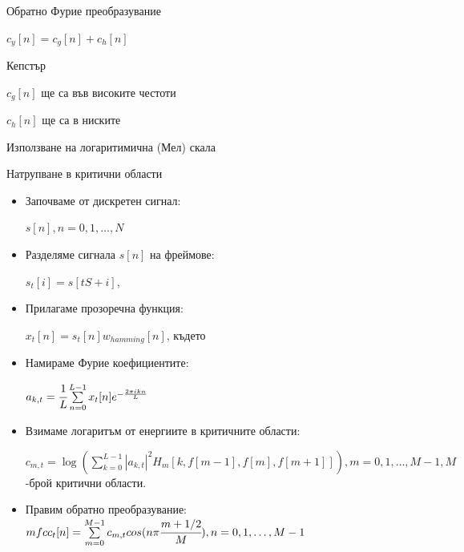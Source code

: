 \documentclass[9pt]{beamer}
\newcommand{\B}[1]{\left(#1\right)}
\begin{document}
\begin{frame}[t]
\begin{itemize}
{\begin{columns}
\begin{column}{0.48\textwidth}
                    \end{column}
                \end{columns}
        }
         {
            \item<5-11> Обратно Фурие преобразувание
            \item<6-11> $c_y[n] = c_g[n] + c_h[n]$
            \item<7-11> Кепстър
            \item<8-11> $c_g[n]$ ще са във високите честоти
            \item<9-11> $c_h[n]$ ще са в ниските
            \item<10-11> Използване на логаритимична (Мел) скала
            \item<11-11> Натрупване в критични области
        }
    \end{itemize}
\end{frame}

\begin{frame}
    \begin{itemize}
        \item Започваме от дискретен сигнал:
        
        \pause
        $s[n], n = 0, 1, \ldots, N$
        \item Разделяме сигнала $s[n]$ на фреймове:
        
        \pause
        $s_t[i] = s[tS + i]$,
        \pause
        \item Прилагаме прозоречна функция:
        
        \pause
        $x_t[n] = s_t[n]w_{hamming}[n]$, където
        \pause
        \item Намираме Фурие коефициентите:
        
        \pause
        $a_{k, t} = \cfrac{1}{L} \sum\limits_{n=0}^{L-1} x_t[n] e^{-\frac{2\pi i k n}{L}}$
        
        \pause
        \item Взимаме логаритъм от енергиите в критичните области: 
        
        \pause
        $c_{m, t} = \log\B{\sum\limits_{k = 0}^{L-1} |a_{k, t}|^2 H_{m}[k, f[m-1], f[m], f[m+1]]}, m = 0, 1, \ldots, M-1, M$-брой критични области.
        \pause
        
        \item Правим обратно преобразувание:
        \pause
        $mfcc_t[n] = \sum\limits_{m = 0}^{M-1} c_{m, t} cos(n\pi \cfrac{m+1/2}{M}), n = 0, 1, \ldots, M-1$
    \end{itemize}
\end{frame}
\end{document}
